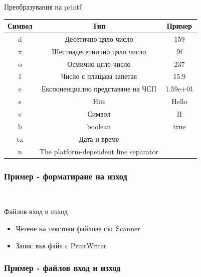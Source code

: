 \documentclass{beamer}
\begin{document}
\begin{frame}{Преобразувания на printf}
  \transdissolve
  \begin{tabular}{|c|c|c|}
    \hline
    Символ  & Тип                &          Пример \\
    \hline
    d & Десетично цяло число &                         159 \\
    \hline
    x & Шестнадесетнично цяло число &                 9f \\
    \hline
    o & Осмично цяло число  &                      237 \\
    \hline
    f & Число с плащава запетая &             15.9 \\
    \hline
    e & Експоненциално представяне на ЧСП &           1.59e+01 \\
    \hline
    s & Низ &                                                Hello \\
    \hline
    c & Символ &                                                 H \\
    \hline
    b &  boolean                 &                        true \\
    \hline
    tx & Дата и време &  \\
    \hline
    n & The platform-dependent line separator & \\
    \hline
  \end{tabular}

\end{frame}

\begin{frame}[fragile]
  \frametitle{Пример - форматиране на изход}
  \transdissolve
\begin{lstlisting}
  
\end{lstlisting}
\end{frame}


\begin{frame}{Файлов вход и изход}
  \transdissolve
  \begin{itemize}
  \item Четене на текстови файлове със Scanner
  \item Запис във файл с PrintWriter
  \end{itemize}
\end{frame}

\begin{frame}[fragile]
  \frametitle{Пример - файлов вход и изход}
  \transdissolve
\begin{lstlisting}
  
\end{lstlisting}
\end{frame}
\end{document}
